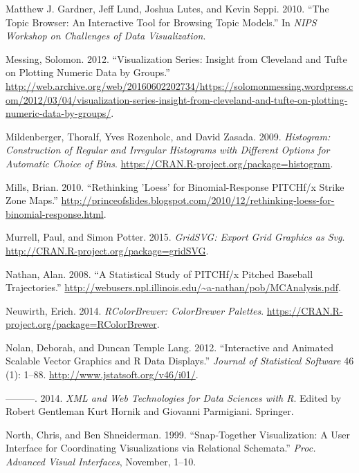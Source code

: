 \documentclass[12pt,]{isuthesis}
\begin{document}
\hypertarget{ref-Gardner}{}
Matthew J. Gardner, Jeff Lund, Joshua Lutes, and Kevin Seppi. 2010.
``The Topic Browser: An Interactive Tool for Browsing Topic Models.'' In
\emph{NIPS Workshop on Challenges of Data Visualization}.

\hypertarget{ref-messing}{}
Messing, Solomon. 2012. ``Visualization Series: Insight from Cleveland
and Tufte on Plotting Numeric Data by Groups.''
\url{http://web.archive.org/web/20160602202734/https://solomonmessing.wordpress.com/2012/03/04/visualization-series-insight-from-cleveland-and-tufte-on-plotting-numeric-data-by-groups/}.

\hypertarget{ref-histogram}{}
Mildenberger, Thoralf, Yves Rozenholc, and David Zasada. 2009.
\emph{Histogram: Construction of Regular and Irregular Histograms with
Different Options for Automatic Choice of Bins}.
\url{https://CRAN.R-project.org/package=histogram}.

\hypertarget{ref-loess}{}
Mills, Brian. 2010. ``Rethinking 'Loess' for Binomial-Response PITCHf/x
Strike Zone Maps.''
\url{http://princeofslides.blogspot.com/2010/12/rethinking-loess-for-binomial-response.html}.

\hypertarget{ref-gridSVG}{}
Murrell, Paul, and Simon Potter. 2015. \emph{GridSVG: Export Grid
Graphics as Svg}. \url{http://CRAN.R-project.org/package=gridSVG}.

\hypertarget{ref-trajecoryAnalysis}{}
Nathan, Alan. 2008. ``A Statistical Study of PITCHf/x Pitched Baseball
Trajectories.''
\url{http://webusers.npl.illinois.edu/~a-nathan/pob/MCAnalysis.pdf}.

\hypertarget{ref-RColorBrewer}{}
Neuwirth, Erich. 2014. \emph{RColorBrewer: ColorBrewer Palettes}.
\url{https://CRAN.R-project.org/package=RColorBrewer}.

\hypertarget{ref-SVGAnnotation}{}
Nolan, Deborah, and Duncan Temple Lang. 2012. ``Interactive and Animated
Scalable Vector Graphics and R Data Displays.'' \emph{Journal of
Statistical Software} 46 (1): 1--88.
\url{http://www.jstatsoft.org/v46/i01/}.

\hypertarget{ref-nolan-lang}{}
---------. 2014. \emph{XML and Web Technologies for Data Sciences with
R}. Edited by Robert Gentleman Kurt Hornik and Giovanni Parmigiani.
Springer.

\hypertarget{ref-North:1999vi}{}
North, Chris, and Ben Shneiderman. 1999. ``Snap-Together Visualization:
A User Interface for Coordinating Visualizations via Relational
Schemata.'' \emph{Proc. Advanced Visual Interfaces}, November, 1--10.
\end{document}
